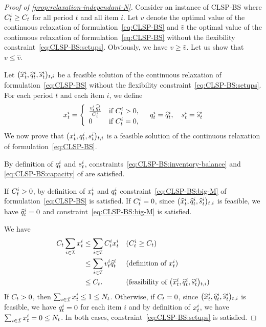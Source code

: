 \begin{proof}[Proof of \cref{prop:relaxation-independant-N}]
Consider an instance of CLSP-BS where $C_t^i\ge C_t$ for all period $t$ and all item $i$.
Let $v$ denote the optimal value of the continuous relaxation of formulation~\eqref{eq:CLSP-BS} and $\widehat{v}$ the optimal value of the continuous relaxation of formulation~\eqref{eq:CLSP-BS} without the flexibility constraint~\eqref{eq:CLSP-BS:setups}.
Obviously, we have $v \ge \widehat{v}$.
Let us show that $v \le \widehat{v}$.

Let $\bracket{\widehat{\setup}_t^i, \widehat{\quantity}_t^i, \widehat{\inventory}_t^i}_{t,i}$ be a feasible solution of the continuous relaxation of formulation~\eqref{eq:CLSP-BS} without the flexibility constraint~\eqref{eq:CLSP-BS:setups}.
For each period $t$ and each item $i$, we define
\begin{equation}
  \setup_t^i=
  \left\{
  \begin{array}{ll}
  \frac{\rate_t^i\,\widehat{\quantity}_t^i}{\capacity_t^i} & \mbox{if}\ \capacity_t^i>0,
  \\
  0 & \mbox{if}\ \capacity_t^i=0,
  \end{array}
  \right.
  \quad
  \quantity_t^i=\widehat{\quantity}_t^i
  ,\quad
  \inventory_t^i=\widehat{\inventory}_t^i
\end{equation}
We now prove that $\bracket{\setup_t^i, \quantity_t^i, \inventory_t^i}_{t,i}$ is a feasible solution of the continuous relaxation of formulation~\eqref{eq:CLSP-BS}.

By definition of $q_t^i$ and $s_t^i$, constraints~\eqref{eq:CLSP-BS:inventory-balance} and \eqref{eq:CLSP-BS:capacity} of are satisfied.

If $C_t^i>0$, by definition of $x_t^i$ and $q_t^i$ constraint~\eqref{eq:CLSP-BS:big-M} of formulation~\eqref{eq:CLSP-BS} is satisfied.
If $C_t^i=0$, since $\bracket{\widehat{\setup}_t^i, \widehat{\quantity}_t^i, \widehat{\inventory}_t^i}_{t,i}$ is feasible, we have $\widehat{q}_t^i=0$ and constraint~\eqref{eq:CLSP-BS:big-M} is satisfied. 

We have
\begin{subequations}
\begin{align}
\capacity_t\sum_{i\in\REF}\setup_t^i
&\le
\sum_{i\in\REF}\capacity_t^i\setup_t^i
&& \mbox{($\capacity_t^i\ge\capacity_t$)}
\\
&\le
\sum_{i\in\REF}\rate_t^i\widehat{\quantity}_t^i
&& \mbox{(definition of $\setup_t^i$)}
\\
&\le
\capacity_t.
&& \mbox{(feasibility of $\bracket{\widehat{\setup}_t^i, \widehat{\quantity}_t^i, \widehat{\inventory}_t^i}_{t,i}$)}
\end{align}
\end{subequations}
If $C_t>0$, then $\sum_{i\in\mathcal{I}}x_t^i\le 1\le N_t$.
Otherwise, if $C_t=0$, since $\bracket{\widehat{\setup}_t^i, \widehat{\quantity}_t^i, \widehat{\inventory}_t^i}_{t,i}$ is feasible, we have $q_t^i=0$ for each item $i$ and by definition of $x_t^i$, we have $\sum_{i\in\mathcal{I}}x_t^i=0\le N_t$.
In both cases, constraint~\eqref{eq:CLSP-BS:setups} is satisfied.


\end{proof}
